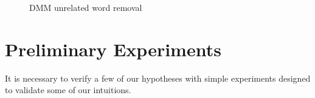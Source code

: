 \documentclass{sig-alternate-05-2015}
\begin{document}
\begin{figure}[t!]
    \centering
    \caption{DMM unrelated word removal}
\end{figure}

\section{Preliminary Experiments}
It is necessary to verify a few of our hypotheses with simple experiments designed to validate some of our intuitions. 
\end{document}
